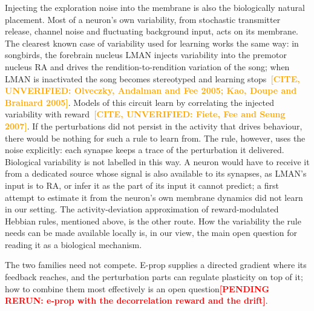 \documentclass[10pt,twocolumn]{article}
\newcommand{\pending}[1]{\textcolor{red}{\bfseries[PENDING RERUN#1]}}
\newcommand{\unverified}[1]{\textcolor{orange}{\bfseries[CITE, UNVERIFIED: #1]}}
\begin{document}
Injecting the exploration noise into the membrane is also the biologically natural
placement. Most of a neuron's own variability, from stochastic transmitter release,
channel noise and fluctuating background input, acts on its membrane. The clearest known
case of variability used for learning works the same way: in songbirds, the forebrain
nucleus LMAN injects variability into the premotor nucleus RA and drives the
rendition-to-rendition variation of the song; when LMAN is inactivated the song becomes
stereotyped and learning stops~\unverified{Olveczky, Andalman and Fee 2005; Kao, Doupe and
Brainard 2005}. Models of this circuit learn by correlating the injected variability
with reward~\citep{fiete2006gradient}\unverified{Fiete, Fee and Seung 2007}. If the
perturbations did not persist in the activity that drives behaviour, there would be
nothing for such a rule to learn from. The rule, however, uses the noise explicitly: each
synapse keeps a trace of the perturbation it delivered. Biological variability is not
labelled in this way. A neuron would have to receive it from a dedicated source whose
signal is also available to its synapses, as LMAN's input is to RA, or infer it as the
part of its input it cannot predict; a first attempt to estimate it from the neuron's own
membrane dynamics did not learn in our setting. The activity-deviation approximation of
reward-modulated Hebbian rules, mentioned above, is the other route. How the variability
the rule needs can be made available locally is, in our view, the main open question for
reading it as a biological mechanism.

The two families need not compete. E-prop supplies a directed gradient where its
feedback reaches, and the perturbation parts can regulate plasticity on top of it;
how to combine them most effectively is an open question\pending{: e-prop with the
decorrelation reward and the drift}.
\end{document}
